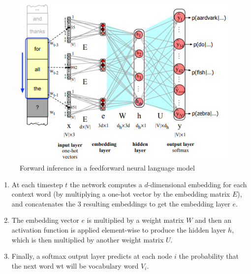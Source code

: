 \begin{table}[H]
    \begin{minipage}{0.55\linewidth}
        \begin{figure}[H]
            \includegraphics[width=\linewidth]{Pictures/nlp/fig-7-17.png}
            \caption{Forward inference in a feedforward neural language model}
        \end{figure}
    \end{minipage}
    \hfill
    \begin{minipage}{0.55\linewidth}
        \begin{enumerate}
            \item At each timestep $t$ the network computes a $d$-dimensional embedding for each context word (by multiplying a one-hot vector by the embedding matrix $E$), and concatenates the $3$ resulting embeddings to get the embedding layer $e$.
            
            \item The embedding vector $e$ is multiplied by a weight matrix $W$ and then an activation function is applied element-wise to produce the hidden layer $h$, which is then multiplied by another weight matrix $U$.

            \item Finally, a softmax output layer predicts at each node $i$ the probability that the next word wt will be vocabulary word $V_i$.
        \end{enumerate}
    \end{minipage}
\end{table}

